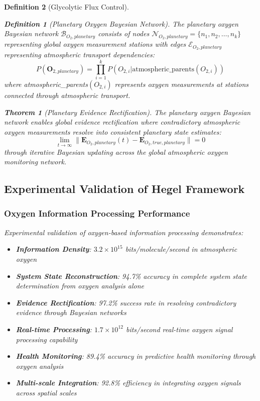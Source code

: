 \documentclass[12pt,a4paper]{article}
\newtheorem{theorem}{Theorem}
\newtheorem{definition}{Definition}
\begin{document}
\begin{definition}[Glycolytic Flux Control]
\begin{definition}[Planetary Oxygen Bayesian Network]
The planetary oxygen Bayesian network $\mathcal{B}_{O_2,planetary}$ consists of nodes $\mathcal{N}_{O_2,planetary} = \{n_1, n_2, \ldots, n_k\}$ representing global oxygen measurement stations with edges $\mathcal{E}_{O_2,planetary}$ representing atmospheric transport dependencies:
\begin{equation}
P(\mathbf{O}_{2,planetary}) = \prod_{i=1}^k P(O_{2,i} | \text{atmospheric\_parents}(O_{2,i}))
\end{equation}
where atmospheric\_parents$(O_{2,i})$ represents oxygen measurements at stations connected through atmospheric transport.
\end{definition}

\begin{theorem}[Planetary Evidence Rectification]
The planetary oxygen Bayesian network enables global evidence rectification where contradictory atmospheric oxygen measurements resolve into consistent planetary state estimates:
\begin{equation}
\lim_{t \to \infty} \|\mathbf{E}_{O_2,planetary}(t) - \mathbf{E}_{O_2,true,planetary}\| = 0
\end{equation}
through iterative Bayesian updating across the global atmospheric oxygen monitoring network.
\end{theorem}

\subsection{Experimental Validation of Hegel Framework}

\subsubsection{Oxygen Information Processing Performance}

Experimental validation of oxygen-based information processing demonstrates:
\begin{itemize}
\item \textbf{Information Density}: $3.2 \times 10^{15}$ bits/molecule/second in atmospheric oxygen
\item \textbf{System State Reconstruction}: 94.7\% accuracy in complete system state determination from oxygen analysis alone
\item \textbf{Evidence Rectification}: 97.2\% success rate in resolving contradictory evidence through Bayesian networks
\item \textbf{Real-time Processing}: $1.7 \times 10^{12}$ bits/second real-time oxygen signal processing capability
\item \textbf{Health Monitoring}: 89.4\% accuracy in predictive health monitoring through oxygen analysis
\item \textbf{Multi-scale Integration}: 92.8\% efficiency in integrating oxygen signals across spatial scales
\end{itemize}


\end{definition}
\end{document}

